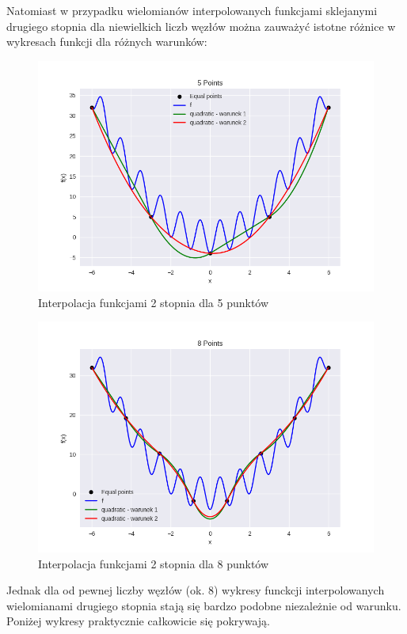 \documentclass{article}
\begin{document}
Natomiast w przypadku wielomianów interpolowanych funkcjami sklejanymi drugiego stopnia dla niewielkich liczb węzłów 
można zauważyć istotne różnice w wykresach funkcji dla różnych warunków:

\begin{figure}[H]
    \centering
    \includegraphics[width=\textwidth]{img/quadratic_5.png}
    \caption{Interpolacja funkcjami 2 stopnia dla 5 punktów}
\end{figure}

\begin{figure}[H]
    \centering
    \includegraphics[width=\textwidth]{img/quadratic_8.png}
    \caption{Interpolacja funkcjami 2 stopnia dla 8 punktów}
\end{figure}

Jednak dla od pewnej liczby węzłów (ok. 8) wykresy funckcji interpolowanych wielomianami drugiego stopnia stają się bardzo podobne niezależnie od warunku.
Poniżej wykresy praktycznie całkowicie się pokrywają.
\end{document}
